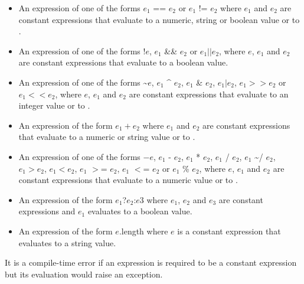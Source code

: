 \documentclass{article}
\newcommand{\code}[1]{{\sf #1}}
\begin{document}
\begin{itemize}
\item An expression of one of the forms  \code{$e_1$ == $e_2$} or  \code{$e_1$ != $e_2$} where $e_1$ and $e_2$ are constant expressions that evaluate to a numeric, string or boolean value or to \NULL{}.
\item An expression of one of the forms \code{!$e$}, \code{$e_1$ \&\& $e_2$} or \code{$e_1 || e_2$}, where  $e$, $e_1$ and $e_2$ are constant expressions that evaluate to a boolean value.
\item An expression of one of the forms \~{}$e$, $e_1$ \^{} $e_2$, \code{$e_1$ \& $e_2$}, $e_1 | e_2$, $e_1 >> e_2$ or $e_1 <<  e_2$, where  $e$, $e_1$ and $e_2$ are constant expressions that evaluate to an integer value  or to \NULL{}.
\item An expression of the form \code{$e_1 + e_2$} where $e_1$ and $e_2$ are constant expressions that evaluate to a numeric or string value or to \NULL{}.
\item An expression of one of the forms \code{$-e$}, \code{$e_1$ - $e_2$}, \code{$e_1$ * $e_2$}, \code{$e_1$ / $e_2$,} \code{$e_1$ \~{}/ $e_2$},  \code{$e_1  >  e_2$}, \code{$e_1  <  e_2$}, \code{$e_1$ $>$= $e_2$}, \code{$e_1$ $<$= $e_2$} or \code{$e_1$ \% $e_2$},  where $e$, $e_1$ and $e_2$ are constant expressions that evaluate to a numeric value  or to \NULL{}.
\item An expression of the form \code{$e_1$?$e_2$:$e3$} where $e_1$, $e_2$ and $e_3$ are constant expressions and $e_1$ evaluates to a boolean value.
\item An expression of the form \code{$e$.length} where $e$ is a constant expression that evaluates to a string value.
\end{itemize}



\LMHash{}
It is a compile-time error if an expression is required to be a constant expression but its evaluation  would raise an exception. 

\end{document}
